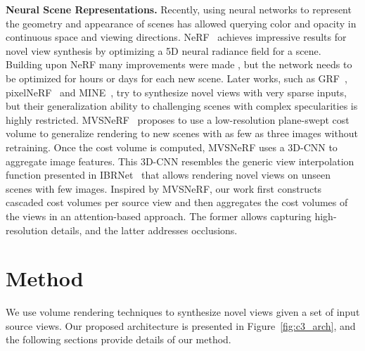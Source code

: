 \noindent\textbf{Neural Scene Representations.} Recently, using neural networks to represent the geometry and appearance of scenes has allowed querying color and opacity in continuous space and viewing directions. NeRF~\cite{mildenhall2020nerf} achieves impressive results for novel view synthesis by optimizing a 5D neural radiance field for a scene. Building upon NeRF many improvements were made \cite{park2021nerfies, li2021neural, martin2021nerf, peng2021neural, schwarz2020graf, srinivasan2021nerv, rockwell2021pixelsynth, DeVries_2021_ICCV, Barron_2021_ICCV}, but the network needs to be optimized for hours or days for each new scene. Later works, such as GRF~\cite{trevithick2021grf}, pixelNeRF~\cite{yu2021pixelnerf} and MINE~\cite{li2021mine}, try to synthesize novel views with very sparse inputs, but their generalization ability to challenging scenes with complex specularities is highly restricted.
MVSNeRF~\cite{chen2021mvsnerf} proposes to use a low-resolution plane-swept cost volume to generalize rendering to new scenes with as few as three images without retraining. Once the cost volume is computed, MVSNeRF uses a 3D-CNN to aggregate image features. This 3D-CNN resembles the generic view interpolation function presented in IBRNet~\cite{wang2021ibrnet} that allows rendering novel views on unseen scenes with few images. Inspired by MVSNeRF, our work first constructs cascaded cost volumes per source view and then aggregates the cost volumes of the views in an attention-based approach. The former allows capturing high-resolution details, and the latter addresses occlusions.

\section{Method}
\label{sec:c3_method}
We use volume rendering techniques to synthesize novel views given a set of input source views. Our proposed architecture is presented in Figure~\ref{fig:c3_arch}, and the following sections provide details of our method.

